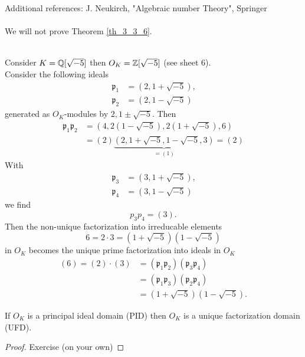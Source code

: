\documentclass[NumTh.tex]{subfiles}
\begin{document}

Additional references: J. Neukirch, "Algebraic number Theory", Springer \\
\\
We will not prove Theorem \ref{th_3_3_6}.\\
\\

\begin{ex}
  Consider $K = \mathbb{Q}[\sqrt{-5}]$ then $O_K = \mathbb{Z}[\sqrt{-5}]$ (see sheet 6).\\
  Consider the following ideals
  \begin{align*}
    \mathfrak{p}_1 &= (2, 1 + \sqrt{-5}) \text{,} \\
    \mathfrak{p}_2 &= (2, 1 - \sqrt{-5})
  \end{align*}
  generated as $O_K$-modules by $2, 1 \pm \sqrt{-5}$. Then 
  \begin{align*}
    \mathfrak{p}_1 \mathfrak{p}_2 &= (4, 2 (1 - \sqrt{-5}), 2 (1+ \sqrt{-5}), 6) \\
    &= (2) \underbrace{(2, 1 + \sqrt{-5}, 1 - \sqrt{-5}, 3)}_{ = (1)} = (2)
  \end{align*}
  With 
  \begin{align*}
  \mathfrak{p}_3 &= (3, 1 + \sqrt{-5}) \text{,} \\
  \mathfrak{p}_4 &= (3, 1 - \sqrt{-5})
  \end{align*}
  we find 
  \[ p_3 p_4 = (3) \text{.} \]
  Then the non-unique factorization into irreducable elements
  \[ 6 = 2 \cdot 3 = (1 + \sqrt{-5}) (1 - \sqrt{-5}) \]
  in $O_K$ becomes the unique prime factorization into ideals in $O_K$
  \begin{align*}
    (6) = (2) \cdot (3) &= (\mathfrak{p}_1 \mathfrak{p}_2) (\mathfrak{p}_3 \mathfrak{p}_4) \\
    &= (\mathfrak{p}_1 \mathfrak{p}_3) (\mathfrak{p}_2 \mathfrak{p}_4) \\
    &= (1 + \sqrt{-5}) (1 - \sqrt{-5}) \text{.}
  \end{align*}
\end{ex}

\begin{cor}\label{cor_3_3_7}
  If $O_K$ is a principal ideal domain (PID) then $O_K$ is a unique factorization domain (UFD).
\end{cor}

\begin{proof}
  Exercise (on your own)
\end{proof}
\end{document}
